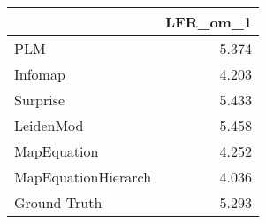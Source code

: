 \begin{tabular}{lr}
\toprule
{} & LFR_om_1 \\
\midrule
PLM                 &    5.374 \\
Infomap             &    4.203 \\
Surprise            &    5.433 \\
LeidenMod           &    5.458 \\
MapEquation         &    4.252 \\
MapEquationHierarch &    4.036 \\
Ground Truth        &    5.293 \\
\bottomrule
\end{tabular}
